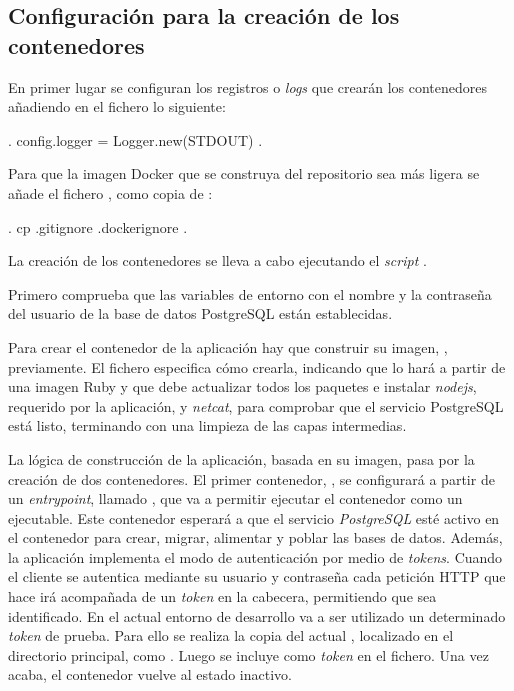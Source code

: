 \subsection{Configuración para la creación de los contenedores}

En primer lugar se configuran los registros o \textit{logs} que crearán los contenedores añadiendo en el fichero  lo siguiente:

\begin{codelisting}
\label{code:application.rb}
\begin{code}
.
config.logger = Logger.new(STDOUT)
.
\end{code}
\end{codelisting}

Para que la imagen Docker que se construya del repositorio sea más ligera se añade el fichero , como copia de :

\begin{codelisting}
\label{code:.dockerignore}
\begin{code}
.
cp .gitignore .dockerignore
.
\end{code}
\end{codelisting}

La creación de los contenedores se lleva a cabo ejecutando el \textit{script} .

Primero comprueba que las variables de entorno con el nombre y la contraseña del usuario de la base de datos PostgreSQL están establecidas.

Para crear el contenedor de la aplicación hay que construir su imagen, , previamente. El fichero  especifica cómo crearla, indicando que lo hará a partir de una imagen Ruby y que debe actualizar todos los paquetes e instalar \textit{nodejs}, requerido por la aplicación, y \textit{netcat}, para comprobar que el servicio PostgreSQL está listo, terminando con una limpieza de las capas intermedias. 

La lógica de construcción de la aplicación, basada en su imagen, pasa por la creación de dos contenedores. El primer contenedor, , se configurará a partir de un \textit{entrypoint}, llamado , que va a permitir ejecutar el contenedor como un ejecutable. Este contenedor esperará a que el servicio \textit{PostgreSQL} esté activo en el contenedor  para crear, migrar, alimentar y poblar las bases de datos. Además, la aplicación implementa el modo de autenticación por medio de \textit{tokens}. Cuando el cliente se autentica mediante su usuario y contraseña cada petición HTTP que hace irá acompañada de un \textit{token} en la cabecera, permitiendo que sea identificado. En el actual entorno de desarrollo va a ser utilizado un determinado \textit{token} de prueba. Para ello se realiza la copia del actual , localizado en el directorio principal, como . Luego se incluye como \textit{token} en el fichero. Una vez acaba, el contenedor  vuelve al estado inactivo. 

